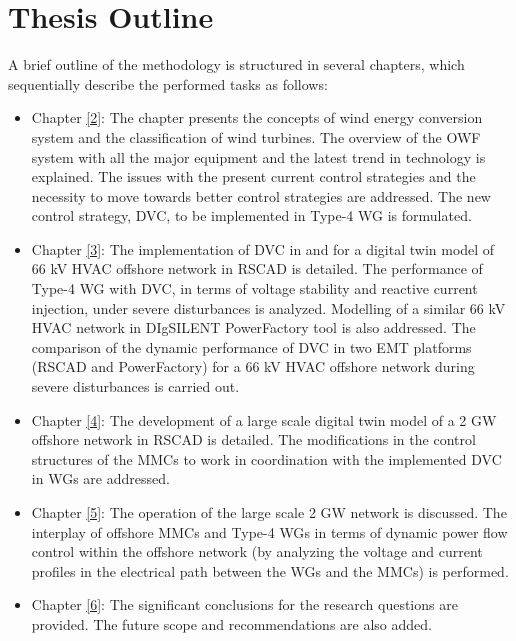 \section{Thesis Outline}
A brief outline of the methodology is structured in several chapters, which sequentially describe the performed tasks as follows:
\begin{itemize}
    \item Chapter \ref{2}: The chapter presents the concepts of wind energy conversion system and the classification of wind turbines. The overview of the \gls{OWF} system with all the major equipment and the latest trend in technology is explained. The issues with the present current control strategies and the necessity to move towards better control strategies are addressed. The new control strategy, \gls{DVC}, to be implemented in Type-4 \gls{WG} is formulated.  
    
    \item Chapter \ref{3}: The implementation of \gls{DVC} in \cite{korai_dynamic_2019} and \cite{sethi_real-time_nodate-new} for a digital twin model of 66 kV \gls{HVAC} offshore network in RSCAD is detailed. The performance of Type-4 \gls{WG} with \gls{DVC}, in terms of voltage stability and reactive current injection, under severe disturbances is analyzed. Modelling of a similar 66 kV \gls{HVAC} network in DIgSILENT PowerFactory tool is also addressed. The comparison of the dynamic performance of \gls{DVC} in two \gls{EMT} platforms (RSCAD and PowerFactory) for a 66 kV \gls{HVAC} offshore network during severe disturbances is carried out. 
    
    \item Chapter \ref{4}: The development of a large scale digital twin model of a 2 GW offshore network in RSCAD is detailed. The modifications in the control structures of the \gls{MMC}s to work in coordination with the implemented \gls{DVC} in \gls{WG}s are addressed.
    
    \item Chapter \ref{5}: The operation of the large scale 2 GW network is discussed. The interplay of offshore \gls{MMC}s and Type-4 \gls{WG}s in terms of dynamic power flow control within the offshore network (by analyzing the voltage and current profiles in the electrical path between the \gls{WG}s and the \gls{MMC}s) is performed. 
    
    \item Chapter \ref{6}: The significant conclusions for the research questions are provided. The future scope and recommendations are also added.
\end{itemize}


